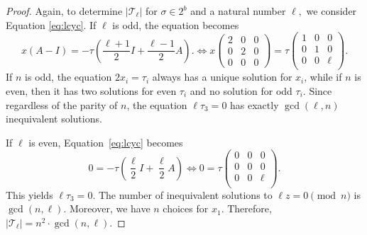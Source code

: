 \documentclass[12pt]{article}
\theoremstyle{definition}
\theoremstyle{remark}
\begin{document}
\begin{proof}
Again, to determine $\vert \mathcal{T}_{\ell}\vert$ for $\sigma\in 2^b$ and a natural number $\ell,$ we consider Equation \eqref{eq:lcyc}.
If $\ell$ is odd, the equation becomes
\begin{equation}\label{eq:lcycodd}
x\left( A- I\right) = -\tau \left(\frac{\ell+1}{2} I+ \frac{\ell -1}{2} A\right).
\Leftrightarrow
x\begin{pmatrix} 2 & 0 & 0 \\
0 & 2 & 0 \\
0 & 0 & 0
\end{pmatrix}=\tau \begin{pmatrix}
    1 & 0 & 0\\
    0 & 1 & 0\\
    0 & 0 &  \ell
    \\
\end{pmatrix}.
\end{equation}
If $n$ is odd, the equation
$2 x_i = \tau_i$ always has a unique solution for $x_i$,
while if $n$ is even, then it has two solutions for even $\tau_i$ and no solution for odd $\tau_i.$
Since regardless of the parity of $n$, the equation $\ell \tau_3=0$ has exactly $\gcd(\ell,n)$ inequivalent solutions.

If $\ell$ is even, Equation~\eqref{eq:lcyc} becomes
\begin{equation}\label{eq:lcycodd}
0 = -\tau \left(\frac{\ell}{2} I+ \frac{\ell }{2} A\right)
\Leftrightarrow
0=\tau \begin{pmatrix}
    0& 0 & 0\\
    0 & 0 & 0\\
    0 & 0 &  \ell
    \\
\end{pmatrix}.
\end{equation}
This yields
$\ell\tau_3 = 0.$
The number of inequivalent solutions to $\ell z =0 \pmod{n}$ is $\gcd(n,\ell).$
Moreover, we have $n$ choices for $x_1$.
Therefore,
 $\vert \mathcal{T}_\ell\vert  = n^2\cdot \gcd(n,\ell).$


\end{proof}
\end{document}
